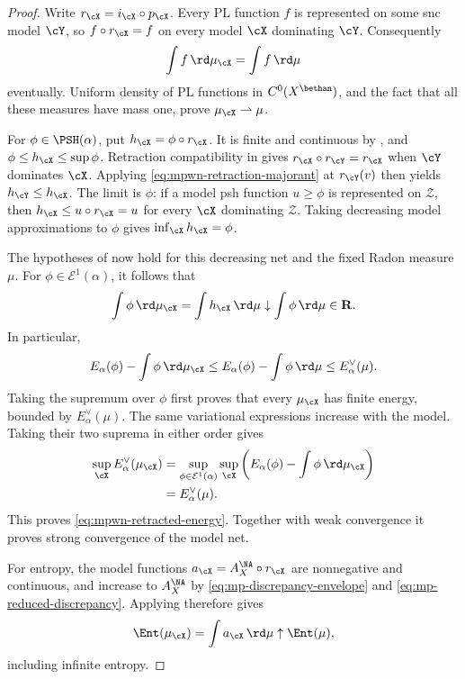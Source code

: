\begin{proof}
Write $r_{\cX}=i_{\cX}\circ p_{\cX}$.  Every PL function $f$
is represented on some snc model $\cY$, so
$f\circ r_{\cX}=f$ on every model $\cX$ dominating $\cY$.
Consequently
\[
                      \int f\,\rd\mu_{\cX}=\int f\,\rd\mu
\]
eventually.  Uniform density of PL functions in $C^0(X^{\bethan})$,
and the fact that all these measures have mass one, prove
$\mu_{\cX}\rightharpoonup\mu$.

For $\phi\in\PSH(\alpha)$, put $h_{\cX}=\phi\circ r_{\cX}$.
It is finite and continuous by ,
and $\phi\leq h_{\cX}\leq\sup\phi$.
Retraction compatibility in  gives
$r_{\cX}\circ r_{\cY}=r_{\cX}$ when $\cY$ dominates $\cX$.
Applying \eqref{eq:mpwn-retraction-majorant} at $r_{\cY}(v)$
then yields $h_{\cY}\leq h_{\cX}$.
The limit is $\phi$: if a model psh function $u\geq\phi$ is
represented on $\mathcal Z$, then $h_{\cX}\leq u\circ r_{\cX}=u$
for every $\cX$ dominating $\mathcal Z$.  Taking decreasing model
approximations to $\phi$ gives $\inf_{\cX}h_{\cX}=\phi$.

The hypotheses of  now hold
for this decreasing net and the fixed Radon measure $\mu$.
For $\phi\in\mathcal E^1(\alpha)$, it follows that
\[
 \int\phi\,\rd\mu_{\cX}
       =\int h_{\cX}\,\rd\mu
             \downarrow\int\phi\,\rd\mu\in\mathbf R.
\]
In particular,
\[
 E_\alpha(\phi)-\int\phi\,\rd\mu_{\cX}
       \leq E_\alpha(\phi)-\int\phi\,\rd\mu
       \leq E_\alpha^\vee(\mu).
\]
Taking the supremum over $\phi$ first proves that every
$\mu_{\cX}$ has finite energy, bounded by $E_\alpha^\vee(\mu)$.
The same variational expressions increase with the model.
Taking their two suprema in either order gives
\[
 \begin{aligned}
 \sup_{\cX}E_\alpha^\vee(\mu_{\cX})
   &=\sup_{\phi\in\mathcal E^1(\alpha)}
        \sup_{\cX}\left(E_\alpha(\phi)-\int\phi\,\rd\mu_{\cX}\right)\\
   &=E_\alpha^\vee(\mu).
 \end{aligned}
\]
This proves \eqref{eq:mpwn-retracted-energy}.  Together with
weak convergence it proves strong convergence of the model net.

For entropy, the model functions
$a_{\cX}=A_X^{\NA}\circ r_{\cX}$ are nonnegative and continuous,
and increase to $A_X^{\NA}$ by
\eqref{eq:mp-discrepancy-envelope} and
\eqref{eq:mp-reduced-discrepancy}.
Applying  therefore gives
\[
 \Ent(\mu_{\cX})=\int a_{\cX}\,\rd\mu
                       \uparrow\Ent(\mu),
\]
including infinite entropy.


\end{proof}
